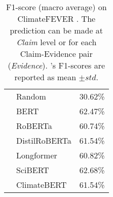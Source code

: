 \begin{table*}[ht]
\begin{subtable}[t]{0.44\textwidth}
{\begin{tabular}{p{3cm}lc}
            \citet{spokoyny2023answering} & Random & 30.62\% \\
            \citet{spokoyny2023answering} & BERT & 62.47\% \\
            \citet{spokoyny2023answering} & RoBERTa & 60.74\% \\
            \citet{spokoyny2023answering} & DistilRoBERTa & 61.54\% \\
            \citet{spokoyny2023answering} & Longformer & 60.82\% \\
            \citet{spokoyny2023answering} & SciBERT & 62.68\% \\
            \citet{spokoyny2023answering} & ClimateBERT & 61.54\% \\       \bottomrule
    
        \end{tabular}
        }
        \caption{F1-score (macro average) on ClimateFEVER \citet{diggelmann_climate-fever_2020}. The prediction can be made at \textit{Claim} level or for each Claim-Evidence pair (\textit{Evidence}).  \citet{nicolas_webersinke_climatebert_2021}'s F1-scores are reported as mean $\pm std$.}
        \label{tab:perf_table_climatefever}
    

\end{subtable}
\end{table*}
